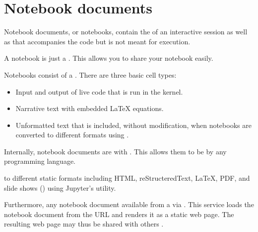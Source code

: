 \documentclass[letterpaper,10pt,english]{sphinxmanual}
\begin{document}
\section{Notebook documents}
\label{\detokenize{notebooks/Intro/Introduction2Jupyter:Notebook-documents}}
\sphinxAtStartPar
Notebook documents, or notebooks, contain the  of an interactive session as well as  that accompanies the code but is not meant for execution.

\sphinxAtStartPar
A notebook is just a . This allows you to share your notebook easily.

\sphinxAtStartPar
Notebooks consist of a . There are three basic cell types:
\begin{itemize}
\item {} 
\sphinxAtStartPar
{} Input and output of live code that is run in the kernel.

\item {} 
\sphinxAtStartPar
{} Narrative text with embedded LaTeX equations.

\item {} 
\sphinxAtStartPar
{} Unformatted text that is included, without modification, when notebooks are converted to different formats using .

\end{itemize}

\sphinxAtStartPar
Internally, notebook documents are  with . This allows them to be  by any programming language.

\sphinxAtStartPar
{} to different static formats including HTML, reStructeredText, LaTeX, PDF, and slide shows () using Jupyter’s  utility.

\sphinxAtStartPar
Furthermore, any notebook document available from a  via . This service loads the notebook document from the URL and renders it as a static web page. The resulting web page may thus be shared with others .
\end{document}
